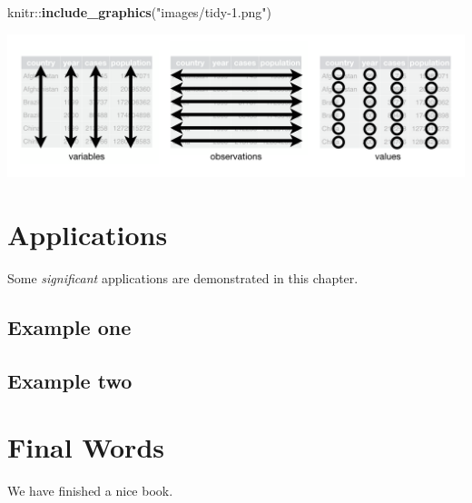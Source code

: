 \documentclass[]{book}
\newenvironment{Shaded}{\begin{snugshade}}{\end{snugshade}}
\newcommand{\KeywordTok}[1]{\textcolor[rgb]{0.13,0.29,0.53}{\textbf{{#1}}}}
\newcommand{\StringTok}[1]{\textcolor[rgb]{0.31,0.60,0.02}{{#1}}}
\newcommand{\NormalTok}[1]{{#1}}
\begin{document}
\begin{Shaded}
\begin{Highlighting}[]
\NormalTok{knitr::}\KeywordTok{include_graphics}\NormalTok{(}\StringTok{"images/tidy-1.png"}\NormalTok{)}
\end{Highlighting}
\end{Shaded}

\includegraphics[width=26.67in]{images/tidy-1}

\chapter{Applications}\label{applications}

Some \emph{significant} applications are demonstrated in this chapter.

\section{Example one}\label{example-one}

\section{Example two}\label{example-two}

\chapter{Final Words}\label{final-words}

We have finished a nice book.


\end{document}
